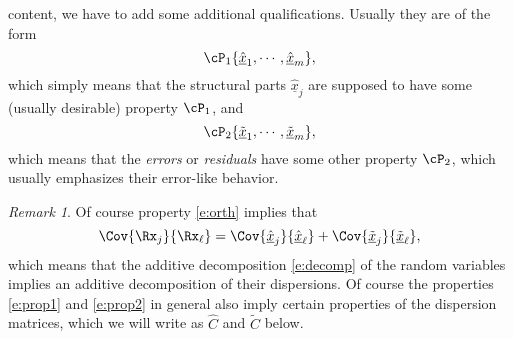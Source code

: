 \documentclass[12pt]{amsart}
\theoremstyle{definition}
\theoremstyle{remark}
\newtheorem{remark}[theorem]{Remark}
\numberwithin{equation}{section}
\begin{document}
content, we have to add some additional qualifications. Usually
they are of the form
%
\begin{equation}\label{e:prop1}
\cP_1\{\underline{\hat x}_1,\cdots,\underline{\hat x}_m\},
\end{equation}
%
which simply means that the structural parts $\underline{\hat x}_j$ are supposed to
have some (usually desirable) property $\cP_1$, and 
%
\begin{equation}\label{e:prop2}
\cP_2\{\underline{\tilde x}_1,\cdots,\underline{\tilde x}_m\},
\end{equation}
%
which means that the \textit{errors} or \textit{residuals}
have some other property $\cP_2$, which usually emphasizes their error-like
behavior.
%
\begin{remark}\label{r:covdec}
Of course property \ref{e:orth} implies that
\begin{equation}\label{e:cdecom}
\Cov{\Rx_j}{\Rx_\ell}=\Cov{\underline{\hat x}_j}{\underline{\hat x}_\ell}+
\Cov{\underline{\tilde x}_j}{\underline{\tilde x}_\ell},
\end{equation}
which means that the additive decomposition \ref{e:decomp} of the
random variables implies an additive decomposition of their
dispersions. Of course the properties \ref{e:prop1} and \ref{e:prop2}
in general also imply certain properties of the dispersion matrices,
which we will write as $\hat C$ and $\tilde C$ below.
\end{remark}
%
\end{document}
